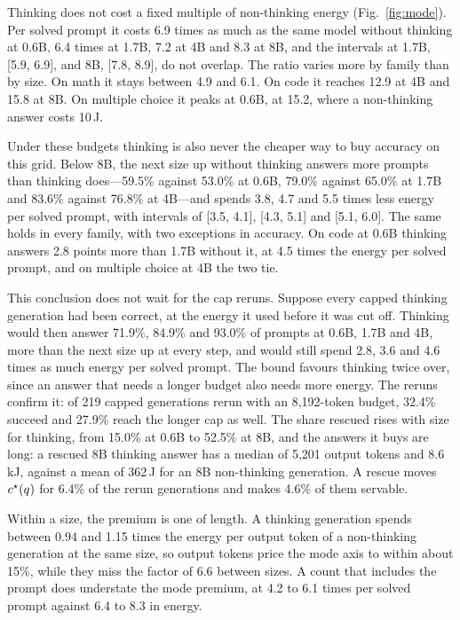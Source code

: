 Thinking does not cost a fixed multiple of non-thinking energy
(Fig.~\ref{fig:mode}). Per solved prompt it costs 6.9 times as much as
the same model without thinking at 0.6B, 6.4 times at 1.7B, 7.2 at 4B and
8.3 at 8B, and the intervals at 1.7B, [5.9, 6.9], and 8B, [7.8, 8.9], do
not overlap. The ratio varies more by family than by size. On math it
stays between 4.9 and 6.1. On code it reaches 12.9 at 4B and 15.8 at 8B.
On multiple choice it peaks at 0.6B, at 15.2, where a non-thinking answer
costs 10\,J.

Under these budgets thinking is also never the cheaper way to buy accuracy
on this grid. Below
8B, the next size up without thinking answers more prompts than thinking
does---59.5\% against 53.0\% at 0.6B, 79.0\% against 65.0\% at 1.7B and
83.6\% against 76.8\% at 4B---and spends 3.8, 4.7 and 5.5 times less
energy per solved prompt, with intervals of [3.5, 4.1], [4.3, 5.1] and
[5.1, 6.0]. The same holds in every family, with two exceptions in
accuracy. On code at 0.6B thinking answers 2.8 points more than 1.7B
without it, at 4.5 times the energy per solved prompt, and on multiple
choice at 4B the two tie.

This conclusion does not wait for the cap reruns. Suppose every capped
thinking generation had been correct, at the energy it used before it was
cut off. Thinking would then answer 71.9\%, 84.9\% and 93.0\% of prompts
at 0.6B, 1.7B and 4B, more than the next size up at every step, and would
still spend 2.8, 3.6 and 4.6 times as much energy per solved prompt. The
bound favours thinking twice over, since an answer that needs a longer
budget also needs more energy. The reruns confirm it: of 219 capped
generations rerun with an 8{,}192-token budget, 32.4\% succeed and 27.9\%
reach the longer cap as well. The share rescued rises with size for
thinking, from 15.0\% at 0.6B to 52.5\% at 8B, and the answers it buys are
long: a rescued 8B thinking answer has a median of 5{,}201 output tokens and
8.6\,kJ, against a mean of 362\,J for an 8B non-thinking generation. A
rescue moves $c^{\star}(q)$ for 6.4\% of the rerun generations and makes 4.6\%
of them servable.

Within a size, the premium is one of length. A thinking generation spends
between 0.94 and 1.15 times the energy per output token of a non-thinking
generation at the same size, so output tokens price the mode axis to
within about 15\%, while they miss the factor of 6.6 between sizes. A count
that includes the prompt does understate the mode premium, at 4.2 to 6.1
times per solved prompt against 6.4 to 8.3 in energy.


